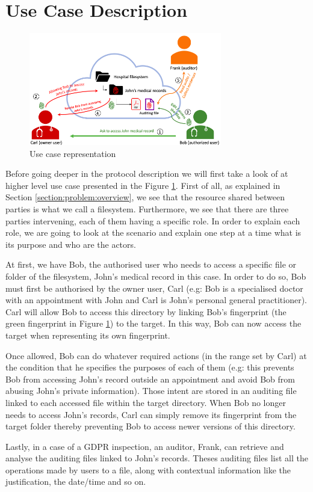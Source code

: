 \documentclass[../main.tex]{subfiles}
\begin{document}
\section{Use Case Description}
\label{section:problem:use_case}

\begin{figure}[h]
    \centering
    \includegraphics[width=0.75\textwidth]{../../images/problem/use_case}
    
    \caption{Use case representation}
    \label{figure:problem:use_case}
\end{figure}

\par Before going deeper in the protocol description we will first take a look of at higher level use case presented in the Figure \ref{figure:problem:use_case}. First of all, as explained in Section \ref{section:problem:overview}, we see that the resource shared between parties is what we call a filesystem. Furthermore, we see that there are three parties intervening, each of them having a specific role. In order to explain each role, we are going to look at the scenario and explain one step at a time what is its purpose and who are the actors.

\par At first, we have Bob, the authorised user who needs to access a specific file or folder of the filesystem, John's medical record in this case. In order to do so, Bob must first be authorised by the owner user, Carl (e.g: Bob is a specialised doctor with an appointment with John and Carl is John's personal general practitioner). Carl will allow Bob to access this directory by linking Bob's fingerprint (the green fingerprint in Figure \ref{figure:problem:use_case}) to the target. In this way, Bob can now access the target when representing its own fingerprint.
\par Once allowed, Bob can do whatever required actions (in the range set by Carl) at the condition that he specifies the purposes of each of them (e.g: this prevents Bob from accessing John's record outside an appointment and avoid Bob from abusing John's private information). Those intent are stored in an auditing file linked to each accessed file within the target directory. When Bob no longer needs to access John's records, Carl can simply remove its fingerprint from the target folder thereby preventing Bob to access newer versions of this directory.
\par Lastly, in a case of a GDPR inspection, an auditor, Frank, can retrieve and analyse the auditing files linked to John's records. Theses auditing files list all the operations made by users to a file, along with contextual information like the justification, the date/time and so on.
\end{document}
